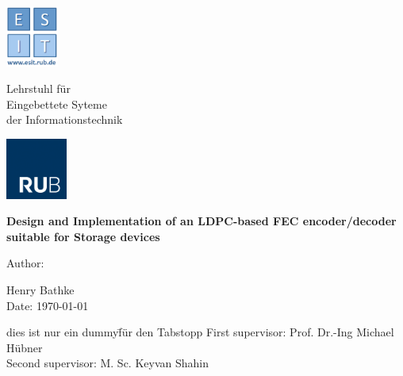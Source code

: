 
\begin{titlepage}
	\thispagestyle{empty}
	\begin{minipage}[b][2.5cm][r]{1.8cm}
	\centering
    \includegraphics[height=2cm, keepaspectratio]{Graphic/Logo.png}
	\end{minipage} \hspace{0.5mm}
	\begin{minipage}[b][2cm][l]{10cm}
		\vspace*{\fill}
		{Lehrstuhl für\\
		Eingebettete Syteme\\
		der Informationstechnik}
		\vspace*{\fill}
	\end{minipage} \hspace{5mm}
	\begin{minipage}[b][2.5cm][r]{2.5cm}
	\centering
    \includegraphics[height=2cm, keepaspectratio]{Graphic/RUB.png}
	\end{minipage}	
	
	
	\begin{center}
		\vspace{3cm}
		
		{\Large \textbf{Design and Implementation of an LDPC-based FEC encoder/decoder suitable for Storage devices}}
		
		\vspace{1cm}
		\vspace{1cm}
		{
			Author: \\
		}
		
		\vspace{1.5cm}
		{
			Henry Bathke \\
		}
		\vspace{1.5cm}
		Date: \today 
		\vspace{1.5cm}
		
		\begin{tabbing}
			dies ist nur ein dummy\= für den Tabstopp \kill
			First supervisor: \> Prof. Dr.-Ing Michael Hübner \\
			Second supervisor: \> M. Sc. Keyvan Shahin
		\end{tabbing}
		
	\end{center}


\end{titlepage}
